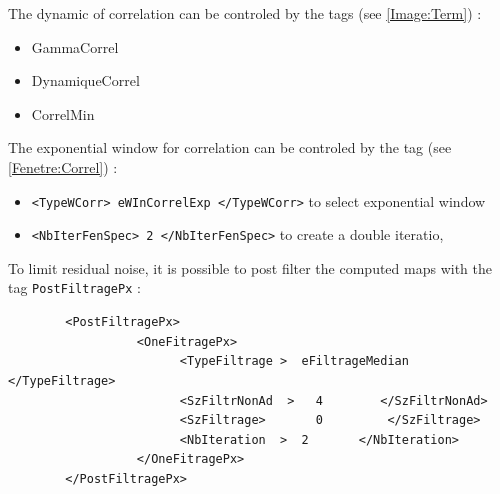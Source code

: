 
The dynamic of correlation can be controled by the tags (see \ref{Image:Term}) :

\begin{itemize}
    \item  GammaCorrel
    \item  DynamiqueCorrel
    \item  CorrelMin
\end{itemize}

The exponential window for correlation can be controled by the tag (see \ref{Fenetre:Correl}) :

\begin{itemize}
    \item  {\tt    <TypeWCorr> eWInCorrelExp            </TypeWCorr>} to select exponential window
    \item  {\tt    <NbIterFenSpec>   2           </NbIterFenSpec>}  to create a double iteratio,
\end{itemize}

To limit residual noise, it is possible to  post filter the computed  maps with the
tag {\tt PostFiltragePx} :

\begin{verbatim}
        <PostFiltragePx>
                  <OneFitragePx>
                        <TypeFiltrage >  eFiltrageMedian  </TypeFiltrage>
                        <SzFiltrNonAd  >   4        </SzFiltrNonAd>
                        <SzFiltrage>       0         </SzFiltrage>
                        <NbIteration  >  2       </NbIteration>
                  </OneFitragePx>
        </PostFiltragePx>
\end{verbatim}


